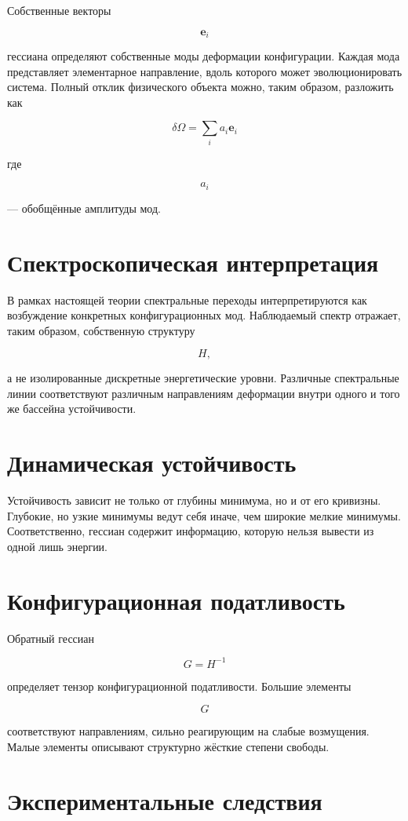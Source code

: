 Собственные векторы

\[ \mathbf e_i \]

гессиана определяют собственные моды деформации конфигурации. Каждая мода представляет элементарное направление, вдоль которого может эволюционировать система. Полный отклик физического объекта можно, таким образом, разложить как

\[ \boxed{ \delta\Omega = \sum_i a_i \mathbf e_i } \]

где

\[ a_i \]

— обобщённые амплитуды мод.

\section{Спектроскопическая интерпретация}

В рамках настоящей теории спектральные переходы интерпретируются как возбуждение конкретных конфигурационных мод. Наблюдаемый спектр отражает, таким образом, собственную структуру

\[ H, \]

а не изолированные дискретные энергетические уровни. Различные спектральные линии соответствуют различным направлениям деформации внутри одного и того же бассейна устойчивости.

\section{Динамическая устойчивость}

Устойчивость зависит не только от глубины минимума, но и от его кривизны. Глубокие, но узкие минимумы ведут себя иначе, чем широкие мелкие минимумы. Соответственно, гессиан содержит информацию, которую нельзя вывести из одной лишь энергии.

\section{Конфигурационная податливость}

Обратный гессиан

\[ \boxed{ G = H^{-1} } \]

определяет тензор конфигурационной податливости. Большие элементы

\[ G \]

соответствуют направлениям, сильно реагирующим на слабые возмущения. Малые элементы описывают структурно жёсткие степени свободы.

\section{Экспериментальные следствия}

